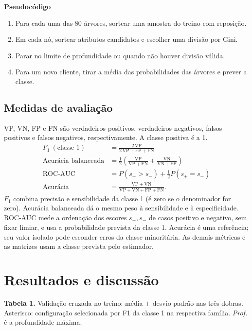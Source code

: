 \documentclass[11pt,a4paper]{article}
\begin{document}
\textbf{Pseudocódigo}
\begin{enumerate}\setlength{\itemsep}{0pt}
  \item Para cada uma das 80 árvores, sortear uma amostra do treino com reposição.
  \item Em cada nó, sortear atributos candidatos e escolher uma divisão por Gini.
  \item Parar no limite de profundidade ou quando não houver divisão válida.
  \item Para um novo cliente, tirar a média das probabilidades das árvores e prever a classe.
\end{enumerate}

\newpage

\subsection*{Medidas de avaliação}
VP, VN, FP e FN são verdadeiros positivos, verdadeiros negativos, falsos
positivos e falsos negativos, respectivamente. A classe positiva é a 1.
\begin{align*}
 F_1\ (\text{classe 1}) &= \frac{2\,\mathrm{VP}}{2\,\mathrm{VP}+\mathrm{FP}+\mathrm{FN}} \\
 \text{Acurácia balanceada} &= \frac{1}{2}\left(
  \frac{\mathrm{VP}}{\mathrm{VP}+\mathrm{FN}} +
  \frac{\mathrm{VN}}{\mathrm{VN}+\mathrm{FP}}\right) \\
 \text{ROC-AUC} &= P(s_{+}>s_{-}) + \tfrac{1}{2}P(s_{+}=s_{-}) \\
 \text{Acurácia} &= \frac{\mathrm{VP}+\mathrm{VN}}{\mathrm{VP}+\mathrm{VN}+\mathrm{FP}+\mathrm{FN}}.
\end{align*}
$F_1$ combina precisão e sensibilidade da classe 1 (é zero se o denominador
for zero). Acurácia balanceada dá o mesmo peso à sensibilidade e à
especificidade. ROC-AUC mede a ordenação dos escores $s_{+},s_{-}$ de casos
positivo e negativo, sem fixar limiar, e usa a probabilidade prevista da
classe 1. Acurácia é uma referência; seu valor isolado pode esconder erros
da classe minoritária. As demais métricas e as matrizes usam a classe
prevista pelo estimador.

\section{Resultados e discussão}
\textbf{Tabela 1.} Validação cruzada no treino: média $\pm$ desvio-padrão
nas três dobras. Asterisco: configuração selecionada por F1 da classe 1
na respectiva família. \emph{Prof.} é a profundidade máxima.
\end{document}
